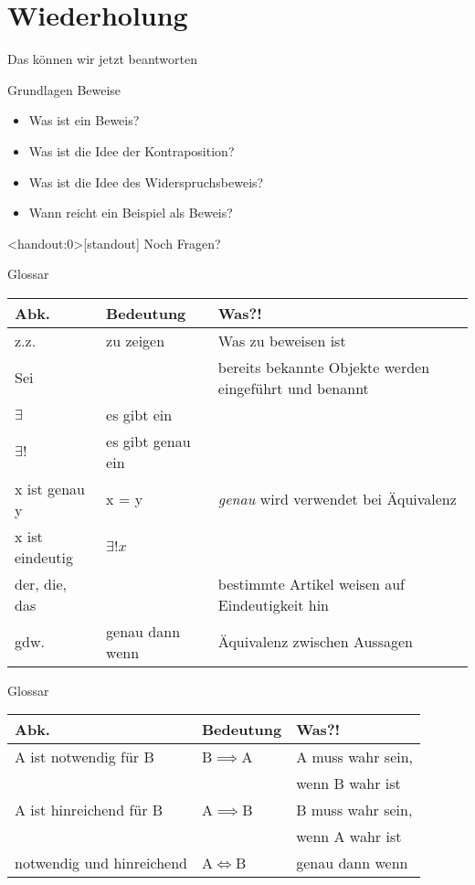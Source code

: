 \section{Wiederholung}
\begin{frame}[fragile]{Das können wir jetzt beantworten}
    \begin{alertblock}{Grundlagen Beweise}
    \begin{itemize}
        \item Was ist ein Beweis?
        \item Was ist die Idee der Kontraposition?
        \item Was ist die Idee des Widerspruchsbeweis?
        \item Wann reicht ein Beispiel als Beweis?
    \end{itemize}
    \end{alertblock}
\end{frame}

\begin{frame}<handout:0>[standout]
  Noch Fragen?
\end{frame}

 \begin{frame}[fragile]{Glossar}
     \small
     \begin{tabular}{p{} p{} p{}}
     \toprule
     Abk.&Bedeutung&Was?!\\
     \midrule
         z.z. & zu zeigen & Was zu beweisen ist\\
         Sei&&bereits bekannte Objekte werden eingeführt und benannt\\
         $\exists$&es gibt ein&\\
         $\exists !$&es gibt genau ein&\\
         x ist genau y&x = y&\emph{genau} wird verwendet bei Äquivalenz\\
         x ist eindeutig&$\exists ! x$&\\
         der, die, das&&bestimmte Artikel weisen auf Eindeutigkeit hin\\
         gdw.&genau dann wenn&Äquivalenz zwischen Aussagen\\
     \bottomrule
     \end{tabular}
 \end{frame}
\begin{frame}[fragile]{Glossar}
    \small
    \begin{tabular}{p{} p{} p{}}
    \toprule
    Abk.&Bedeutung&Was?!\\
    \midrule
        A ist notwendig für B&B$\implies$A&A muss wahr sein,\\
        &&wenn B wahr ist\\
        A ist hinreichend für B&A$\implies$B&B muss wahr sein,\\
        &&wenn A wahr ist\\
        notwendig und hinreichend&A$\iff$B&genau dann wenn\\
    \bottomrule
    \end{tabular}
\end{frame}

